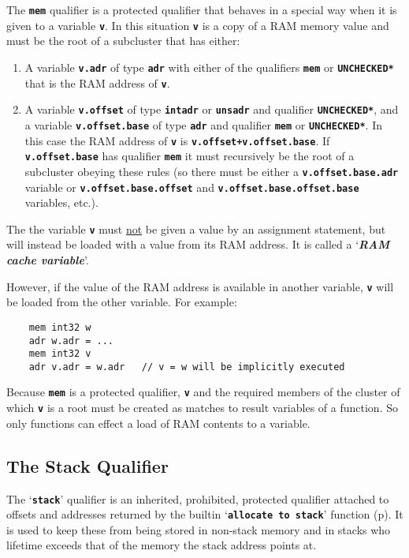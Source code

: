 \documentclass[12pt]{article}
\makeatletter
\newcommand{\TT}[1]{{\tt \bfseries #1}}
\newcommand{\key}[1]{{\bf \em #1}\index{#1}}
\newcommand{\ttkey}[1]{\TT{#1}\index{#1@{\tt #1}}}
\newcommand{\pagref}[1]{p\pageref{#1}}
\newcommand{\EOL}{\penalty \exhyphenpenalty}
\newenvironment{indpar}[1][0.3in]%
	{\begin{list}{}%
		     {\setlength{\itemsep}{0in}%
		      \setlength{\topsep}{0in}%
		      \setlength{\parsep}{1ex}%
		      \setlength{\labelwidth}{#1}%
		      \setlength{\leftmargin}{#1}%
		      \addtolength{\leftmargin}{\labelsep}}%
	 \item}%
	{\end{list}}
\makeatother
\begin{document}
The \ttkey{mem} qualifier is a protected qualifier that behaves
in a special way when it is given to a variable \TT{v}.
In this situation \TT{v} is a copy of a RAM memory value and
must be the root of a subcluster that
has either:
\begin{enumerate}
\item
A variable \TT{v.adr} of type \TT{adr} with either of the qualifiers
\TT{mem} or \TT{*UNCHECKED*} that is the RAM address of \TT{v}.

\item
A variable \TT{v.offset} of type \TT{intadr} or \TT{unsadr} and
qualifier \TT{*UNCHECKED*}, and
a variable \TT{v.offset.base} of type \TT{adr} and qualifier \TT{mem}
or \TT{*UNCHECKED*}.
In this case the RAM address of \TT{v} is \TT{v.offset+v.offset.base}.
If \TT{v.offset.base} has qualifier \TT{mem} it must recursively be
the root of a subcluster obeying
these rules (so there must be either a \TT{v.offset.base.adr} variable
or \TT{v.offset.base.offset} and \TT{v.offset.base\EOL .offset.base}
variables, etc.).
\end{enumerate}
The the
variable \TT{v} must \underline{not} be given a value by an
assignment statement, but will instead be loaded with a value
from its RAM address.  It is called a `\key{RAM cache variable}'.

However, if the value of the RAM address is available in another
variable, \TT{v} will be loaded from the other variable.
For example:
\begin{indpar}\begin{verbatim}
    mem int32 w
    adr w.adr = ...
    mem int32 v
    adr v.adr = w.adr	// v = w will be implicitly executed
\end{verbatim}\end{indpar}

Because \TT{mem} is a protected qualifier, \TT{v} and the required
members of the cluster of which \TT{v} is a root
must be created as matches to result variables of a function.
So only functions can effect a load of RAM contents to a variable.


\subsection{The Stack Qualifier}
\label{THE-STACK-QUALIFIER}

The `\ttkey{stack}' qualifier is an inherited, prohibited,
protected qualifier
attached to offsets and addresses
returned by the builtin `\TT{allocate to stack}'
function (\pagref{ALLOCATE-TO-STACK}).
It is used to keep these from being stored in
non-stack memory and in stacks who lifetime exceeds that of the
memory the stack address points at.
\end{document}
